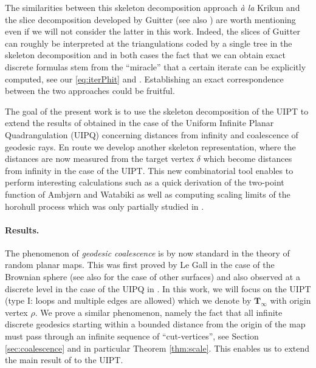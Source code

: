 \documentclass[AHL,XML,longabstracts,Unicode,NoSaveZebib]{cedram}
\begin{document}
The similarities between this skeleton decomposition approach \emph{\`a la} Krikun and the slice decomposition developed by Guitter \cite{G17} (see also \cite[Appendix A]{BG12}) are worth mentioning even if we will not consider the latter in this work. Indeed, the slices of Guitter can roughly be interpreted at the triangulations coded by a single tree in the skeleton decomposition and in both cases the fact that we can obtain exact discrete formulas stem from the ``miracle'' that a certain iterate can be explicitly computed, see our \eqref{eq:iterPhit} and \cite[Eq (3)]{G17}. Establishing an exact correspondence between the two approaches could be fruitful.

\medskip

The goal of the present work is to use the skeleton decomposition of the UIPT to extend the results of \cite{CMM10} obtained in the case of the Uniform Infinite Planar Quadrangulation (UIPQ) concerning distances from infinity and coalescence of geodesic rays. En route we develop another skeleton representation, where the distances are now measured from the target vertex $\delta$ which become distances from infinity in the case of the UIPT. This new combinatorial tool enables to perform interesting calculations such as a quick derivation of the two-point function of Ambj\o rn and Watabiki \cite{ADJ}  as well as computing  scaling limits of the horohull process which was only partially studied in \cite{CMM10}.

\paragraph{Results.} The phenomenon of \emph{geodesic coalescence} is by now standard in the theory of random planar maps. This was first proved by Le Gall \cite{LG09} in the case of the Brownian sphere (see also \cite{Bet16} for the case of other surfaces) and also observed at a discrete level in the case of the UIPQ in \cite{CMM10}. In this work, we will focus on the UIPT (type I: loops and multiple edges are allowed) which we denote by $ \mathbf{T}_{\infty}$ with origin vertex $\rho$. We prove a similar phenomenon, namely the fact that all infinite discrete geodesics starting within a bounded distance from the origin of the map must pass through an infinite sequence of ``cut-vertices'', see Section \ref{sec:coalescence} and in particular Theorem \ref{thm:scale}. This enables us to extend the main result of \cite{CMM10} to the UIPT.
\end{document}
